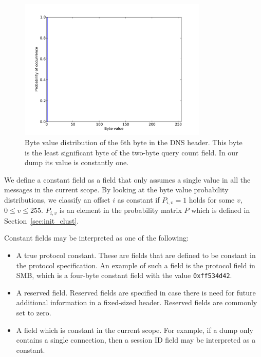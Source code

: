 \documentclass[a4paper]{report}
\begin{document}
\begin{figure}[h]
    \centering
    \includegraphics[width=0.8\textwidth]{img/const_one}
    \captionsetup{width=0.8\textwidth}
    \caption{Byte value distribution of the 6th byte in the DNS header. This
        byte is the least significant byte of the two-byte query count field.
        In our dump its value is constantly one.}
    \label{fig:const_one}
\end{figure}

We define a constant field as a field that only assumes a single value in all
the messages in the current scope. By looking at the byte value probability
distributions, we classify an offset $i$ as constant if $P_{i,v} = 1$ holds for
some $v$, $0 \le v \le 255$. $P_{i,v}$ is an element in the probability
matrix $P$ which is defined in Section~\ref{sec:init_clust}.

Constant fields may be interpreted as one of the following:
\begin{itemize}
    \item A true protocol constant. These are fields that are defined to be
        constant in the protocol specification. An example of such a field is
        the protocol field in SMB, which is a four-byte constant field with
        the value \verb+0xff534d42+.
    \item A reserved field. Reserved fields are specified in case there is need
        for future additional information in a fixed-sized header. Reserved
        fields are commonly set to zero.
    \item A field which is constant in the current scope. For example, if a dump
        only contains a single connection, then a session ID field may be
        interpreted as a constant. 
\end{itemize}
\end{document}
